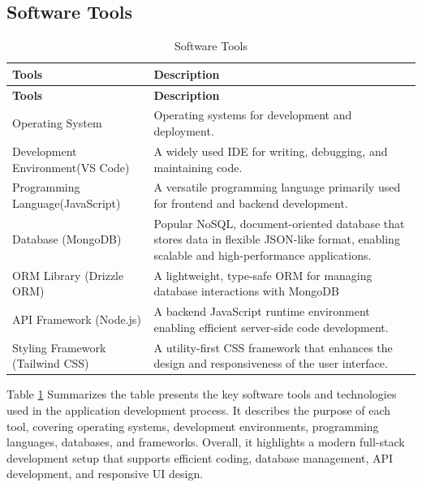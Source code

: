\documentclass[a4paper, 12pt]{report}
\begin{document}
\subsection{Software Tools}
\begin{longtable}{|p{}|p{}|}
    \caption{Software Tools}\label{tab:software_Tools} \\
    
    \hline
    \textbf{Tools} & \textbf{Description} \\
    \hline
    \endfirsthead

    \hline
    \textbf{Tools} & \textbf{Description} \\
    \hline
    \endhead

    \hline
    \endfoot

    \hline
    \endlastfoot

    Operating System & Operating systems for development and deployment. \\
    \hline
    Development Environment(VS Code)& A widely used IDE for writing, debugging, and maintaining code.\\
    \hline
    Programming Language(JavaScript)& A versatile programming language primarily used for frontend and backend development. \\
     \hline
    Database (MongoDB)& Popular NoSQL, document-oriented database that stores data in flexible JSON-like format, enabling scalable and high-performance applications. \\
     \hline
   ORM Library (Drizzle ORM)& A lightweight, type-safe ORM for managing database interactions with MongoDB \\
     \hline
    API Framework (Node.js) & A backend JavaScript runtime environment enabling efficient server-side code development. \\
     \hline
    Styling Framework (Tailwind CSS) & A utility-first CSS framework that enhances the design and responsiveness of the user interface. \\
\end{longtable}
Table \ref{tab:software_Tools} Summarizes the table presents the key software tools and technologies used in the application development process. It describes the purpose of each tool, covering operating systems, development environments, programming languages, databases, and frameworks. Overall, it highlights a modern full-stack development setup that supports efficient coding, database management, API development, and responsive UI design.
\end{document}
